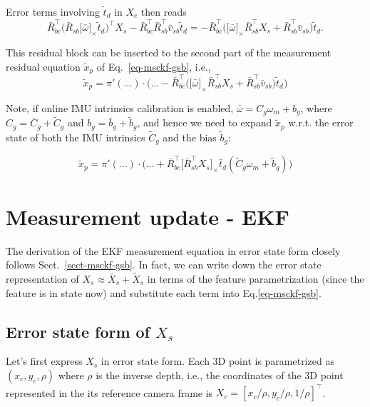 \documentclass[letter,10pt]{article}
\newcommand{\asym}[1]{{\lbrack #1\rbrack}_\times{}}
\begin{document}
Error terms involving $\tilde t_d$ in $X_c$ then reads
$$
\bar R_{bc}^\top \big(\bar R_{sb}\asym{\bar\omega}\tilde t_d)^\top X_s - \bar R_{bc}^\top \bar R_{sb}^\top \bar v_{sb} \tilde t_d
= -\bar R_{bc}^\top \big(\asym{\bar\omega}\bar R_{sb}^\top X_s + \bar R_{sb}^\top \bar v_{sb} \big)\tilde t_d.
$$

This residual block can be inserted to the second part of the measurement residual equation $\tilde x_p$ of Eq.~\eqref{eq-msckf-gsb}, i.e., 
$$
\tilde x_p=\pi'(\ldots)\cdot\big(\ldots
- \bar R_{bc}^\top \big(\asym{\bar\omega}\bar R_{sb}^\top X_s + \bar R_{sb}^\top \bar v_{sb} \big)\tilde t_d
\big)
$$

Note, if online IMU intrinsics calibration is enabled, $\bar \omega=C_g \omega_m + b_g$, where $C_g = \bar C_g + \tilde C_g$ and $b_g=\bar b_g + \tilde b_g$, and hence we need to expand $\tilde x_p$ w.r.t. the error state of both the IMU intrinsics $\tilde C_g$ and the bias $\tilde b_g$:

$$
\tilde x_p
= \pi'(\ldots)\cdot
\big(
    \ldots
    +\bar R_{bc}^\top\asym{\bar R_{sb}^\top X_s} \bar t_d 
    ( \tilde C_g \omega_m + \tilde b_g)
\big)
$$







\section{Measurement update - EKF}

The derivation of the EKF measurement equation in error state form closely follows Sect.~\ref{sect-msckf-gsb}. In fact, we can write down the error state representation of $X_s\approx \bar{X}_s + \tilde{X}_s$ in terms of the feature parametrization (since the feature is in state now) and substitute each term into Eq.\eqref{eq-msckf-gsb}.

\subsection{Error state form of $X_s$}

Let's first express $X_s$ in error state form. Each 3D point is parametrized as $(x_c, y_c, \rho)$ where $\rho$ is the inverse depth, i.e., the coordinates of the 3D point represented in the its reference camera frame is $X_c = [x_c/\rho, y_c/\rho, 1/\rho]^\top$.
\end{document}
